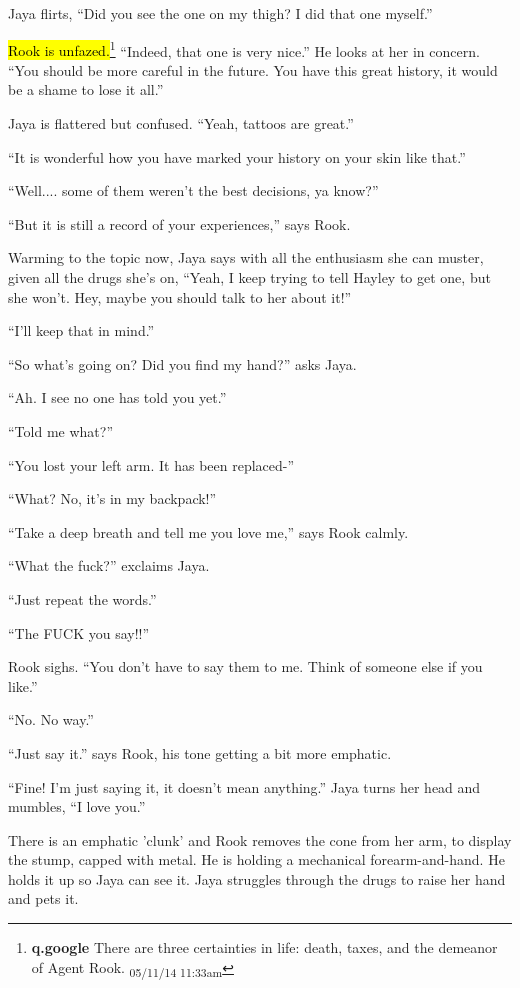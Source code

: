 Jaya flirts, ``Did you see the one on my thigh? I did that one myself.''

\hl{Rook is unfazed.}\footnote{\textbf{q.google }There are three certainties in life: death, taxes, and the demeanor of Agent Rook. \textsubscript{05/11/14 11:33am}}  ``Indeed, that one is very nice.''  He looks at her in concern.  ``You should be more careful in the future.  You have this great history, it would be a shame to lose it all.''

Jaya is flattered but confused.  ``Yeah, tattoos are great.''

``It is wonderful how you have marked your history on your skin like that.''

``Well.... some of them weren't the best decisions, ya know?''

``But it is still a record of your experiences,'' says Rook.

Warming to the topic now, Jaya says with all the enthusiasm she can muster, given all the drugs she's on, ``Yeah, I keep trying to tell Hayley to get one, but she won't.  Hey, maybe you should talk to her about it!''

``I'll keep that in mind.''

``So what's going on?  Did you find my hand?'' asks Jaya.

``Ah. I see no one has told you yet.''

``Told me what?''

``You lost your left arm.  It has been replaced-''

``What?  No, it's in my backpack!''

``Take a deep breath and tell me you love me,'' says Rook calmly.

``What the fuck?'' exclaims Jaya.

``Just repeat the words.''

``The FUCK you say!!''

Rook sighs.  ``You don't have to say them to me.  Think of someone else if you like.''

``No.  No way.''

``Just say it.'' says Rook, his tone getting a bit more emphatic.

``Fine!  I'm just saying it, it doesn't mean anything.''  Jaya turns her head and mumbles, ``I love you.''

There is an emphatic 'clunk' and Rook removes the cone from her arm, to display the stump, capped with metal. He is holding a mechanical forearm-and-hand. He holds it up so Jaya can see it.  Jaya struggles through the drugs to raise her hand and pets it.

